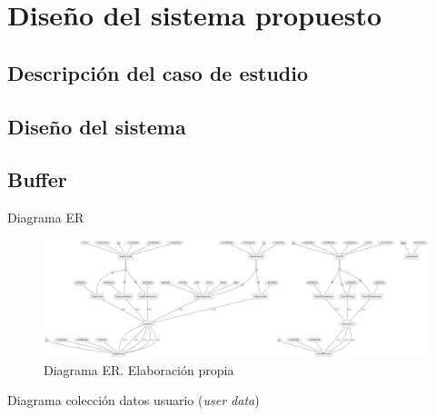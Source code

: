 \chapter{Diseño del sistema propuesto}
\label{chapter:disenio}


\section{Descripción del caso de estudio} \label{section:CasoEstudio}


\section{Diseño del sistema}


\section{Buffer}

Diagrama ER

\begin{figure}
    \centering
    \includegraphics[width=1\textwidth]{figures/bd/ER simple.png}
    \caption[Diagrama ER]{Diagrama ER. Elaboración propia}
    \label{figure:disenio:diagrama_er}
\end{figure}

Diagrama colección datos usuario (\textit{user data})


